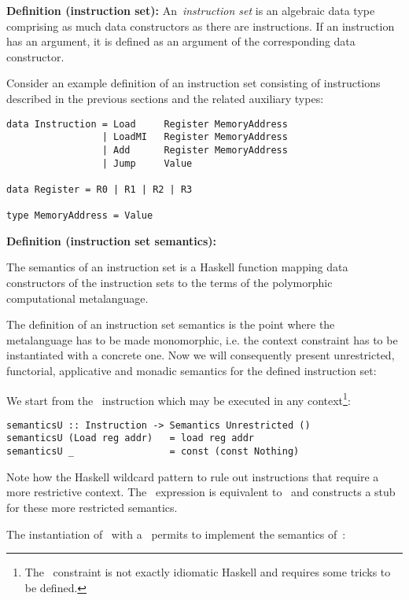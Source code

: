 \textbf{Definition (instruction set):} An~\emph{instruction set} is an algebraic data type
comprising as much data constructors as there are instructions.
If an instruction has an argument, it is defined as an argument of the corresponding data constructor.

Consider an example definition of an instruction set consisting
of instructions described in the previous sections and the related auxiliary types:

\begin{verbatim}
data Instruction = Load     Register MemoryAddress
                 | LoadMI   Register MemoryAddress
                 | Add      Register MemoryAddress
                 | Jump     Value

data Register = R0 | R1 | R2 | R3

type MemoryAddress = Value
\end{verbatim}

\textbf{Definition (instruction set semantics):}

The semantics of an instruction set is a Haskell function mapping
data constructors of the instruction sets to the terms of the polymorphic
computational metalanguage.

The definition of an instruction set semantics is the point where the metalanguage
has to be made monomorphic, i.e. the context constraint has to be instantiated with
a concrete one. Now we will consequently present unrestricted, functorial,
applicative and monadic semantics for the defined instruction set:

We start from the~ instruction which may be executed in any
context\footnote{The~ constraint is not exactly idiomatic Haskell and
requires some tricks to be defined.}:

\begin{verbatim}
semanticsU :: Instruction -> Semantics Unrestricted ()
semanticsU (Load reg addr)   = load reg addr
semanticsU _                 = const (const Nothing)
\end{verbatim}

\noindent Note how the Haskell wildcard pattern to rule out instructions that require a more
restrictive context. The~ expression is equivalent
to~ and constructs a stub for these more restricted
semantics.

The instantiation of~ with a~ permits to implement the semantics
of~:

